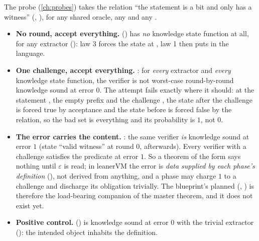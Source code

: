 The probe  (\cref{ch:probes}) takes the relation \enquote{the statement is a bit
and only  has a witness} (, ),
for any shared oracle, any  and any .
\begin{itemize}
\item \textbf{No round, accept everything.}  (\allowbreak{})
  has \emph{no} knowledge state function at all, for any extractor
  (\allowbreak{}): law 3 forces the state at , law 1 then puts
   in the language.
\item \textbf{One challenge, accept everything.} \allowbreak{}\allowbreak{}\allowbreak{}: for
  \emph{every} extractor and \emph{every} knowledge state function, the verifier is not worst-case
  round-by-round knowledge sound at error $0$. The attempt fails exactly where it should: at the
  statement , the empty prefix and the challenge , the state after the
  challenge is forced true by acceptance and the state before is forced false by the relation, so
  the bad set is everything and its probability is $1$, not $0$.
\item \textbf{The error carries the content.} : the same verifier
  \emph{is} knowledge sound at error $1$ (state \enquote{valid witness} at round $0$, 
  afterwards). Every verifier with a challenge satisfies the predicate at error $1$. So a theorem
  of the form  says nothing until $\varepsilon$ is
  read; in leanerVM the error  is \emph{data supplied by each
  phase's definition} (), not derived from anything, and a phase may charge
  $1$ to a challenge and discharge its  obligation trivially. The blueprint's planned
   (,
  \allowbreak{}\allowbreak{}) is therefore the load-bearing companion of the
  master theorem, and it does not exist yet.
\item \textbf{Positive control.}  (\allowbreak{})
  is knowledge sound at error $0$ with the trivial extractor (): the
  intended object inhabits the definition.

\end{itemize}
